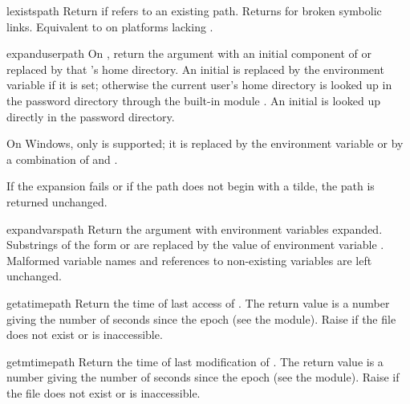 \begin{funcdesc}{lexists}{path}
Return  if  refers to an existing path.
Returns  for broken symbolic links.  
Equivalent to  on platforms lacking
.
\end{funcdesc}

\begin{funcdesc}{expanduser}{path}
On \UNIX, return the argument with an initial component of \samp{\~} or
 replaced by that 's home directory.
An initial \samp{\~} is replaced by the environment variable
 if it is set; otherwise the current user's home directory
is looked up in the password directory through the built-in module
.
An initial  is looked up directly in the
password directory.

On Windows, only \samp{\~} is supported; it is replaced by the
environment variable  or by a combination of
 and .

If the expansion fails or if the
path does not begin with a tilde, the path is returned unchanged.
\end{funcdesc}

\begin{funcdesc}{expandvars}{path}
Return the argument with environment variables expanded.  Substrings
of the form  or  are
replaced by the value of environment variable .  Malformed
variable names and references to non-existing variables are left
unchanged.
\end{funcdesc}

\begin{funcdesc}{getatime}{path}
Return the time of last access of .  The return
value is a number giving the number of seconds since the epoch (see the 
 module).  Raise  if the file does
not exist or is inaccessible.
\end{funcdesc}

\begin{funcdesc}{getmtime}{path}
Return the time of last modification of .  The return
value is a number giving the number of seconds since the epoch (see the 
 module).  Raise  if the file does
not exist or is inaccessible.
\end{funcdesc}

